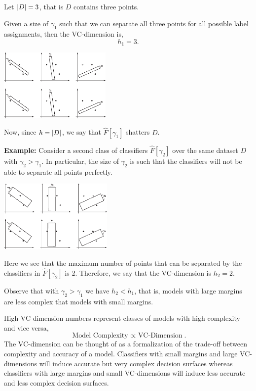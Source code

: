 \documentclass[a4paper,blends,pdf,colorBG,slideColor]{prosper}
\begin{document}
Let $|{D}| = 3$, that is $D$ contains three points.

Given a size of $\gamma_1$ such that we can
separate all three points for all possible label assignments, then the VC-dimension is,
\[
h_1 = 3.
\]

\vspace{.1in}
\begin{center}
\includegraphics[height=35mm]{figures/fig10-02.eps}
\end{center}
Now, since $h = |{D}|$, we say that $\hat{F}[\gamma_1]$ shatters $D$.
\es

\small
{\bf Example:} Consider a second class of classifiers $\hat{F}[\gamma_2]$ over the same dataset $D$
with $\gamma_2 > \gamma_1$.  In particular, the size of $\gamma_2$ is such that
the classifiers will not be able to separate all points perfectly. 
\begin{center}
\includegraphics[height=35mm]{figures/fig10-03.eps}
\end{center}

Here we see that the maximum number of points that can be
separated by the classifiers in $\hat{F}[\gamma_2]$ is 2.  Therefore, we say that the
VC-dimension is $h_2 = 2$.

Observe that with $\gamma_2 > \gamma_1$ we have $h_2 < h_1$, that is, models with large
margins are less complex that models with small margins.
\es



High VC-dimension numbers represent classes of models with high complexity and vice versa,
\[
\mbox{Model Complexity $\propto$ VC-Dimension}.
\]
The VC-dimension can be thought of as a formalization of the trade-off between
complexity and accuracy of a model.  
Classifiers with small margins and large VC-dimensions
will induce accurate but very
complex decision surfaces whereas classifiers with large
margins and small VC-dimensions will induce less accurate
and less complex decision surfaces.
\end{document}
